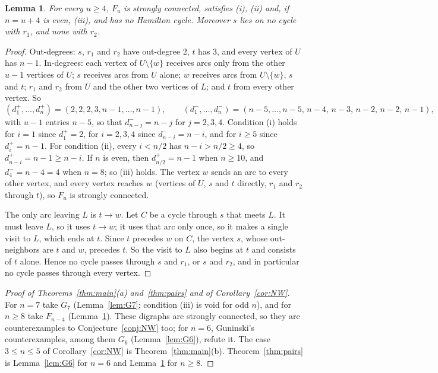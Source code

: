 \documentclass[11pt]{article}
\newtheorem{lemma}[theorem]{Lemma}
\begin{document}
\begin{lemma}\label{lem:F}
For every $u\ge4$, $F_u$ is strongly connected, satisfies (i), (ii) and, if $n=u+4$ is even, (iii), and has no Hamilton cycle. Moreover $s$ lies on no cycle with $r_1$, and none with $r_2$.
\end{lemma}

\begin{proof}
Out-degrees: $s$, $r_1$ and $r_2$ have out-degree $2$, $t$ has $3$, and every vertex of $U$ has $n-1$. In-degrees: each vertex of $U\setminus\{w\}$ receives arcs only from the other $u-1$ vertices of $U$; $s$ receives arcs from $U$ alone; $w$ receives arcs from $U\setminus\{w\}$, $s$ and $t$; $r_1$ and $r_2$ from $U$ and the other two vertices of $L$; and $t$ from every other vertex. So
\[
(d^+_1,\dots,d^+_n)=(2,2,2,3,n-1,\dots,n-1),\qquad
(d^-_1,\dots,d^-_n)=(n-5,\dots,n-5,\,n-4,\,n-3,\,n-2,\,n-2,\,n-1),
\]
with $u-1$ entries $n-5$, so that $d^-_{n-j}=n-j$ for $j=2,3,4$. Condition (i) holds for $i=1$ since $d^+_1=2$, for $i=2,3,4$ since $d^-_{n-i}=n-i$, and for $i\ge5$ since $d^+_i=n-1$. For condition (ii), every $i<n/2$ has $n-i>n/2\ge4$, so $d^+_{n-i}=n-1\ge n-i$. If $n$ is even, then $d^+_{n/2}=n-1$ when $n\ge10$, and $d^-_4=n-4=4$ when $n=8$; so (iii) holds. The vertex $w$ sends an arc to every other vertex, and every vertex reaches $w$ (vertices of $U$, $s$ and $t$ directly, $r_1$ and $r_2$ through $t$), so $F_u$ is strongly connected.

The only arc leaving $L$ is $t\to w$. Let $C$ be a cycle through $s$ that meets $L$. It must leave $L$, so it uses $t\to w$; it uses that arc only once, so it makes a single visit to $L$, which ends at $t$. Since $t$ precedes $w$ on $C$, the vertex $s$, whose out-neighbors are $t$ and $w$, precedes $t$. So the visit to $L$ also begins at $t$ and consists of $t$ alone. Hence no cycle passes through $s$ and $r_1$, or $s$ and $r_2$, and in particular no cycle passes through every vertex.
\end{proof}

\begin{proof}[Proof of Theorems~\ref{thm:main}(a) and~\ref{thm:pairs} and of Corollary~\ref{cor:NW}]
For $n=7$ take $G_7$ (Lemma~\ref{lem:G7}; condition (iii) is void for odd $n$), and for $n\ge8$ take $F_{n-4}$ (Lemma~\ref{lem:F}). These digraphs are strongly connected, so they are counterexamples to Conjecture~\ref{conj:NW} too; for $n=6$, Guninski's counterexamples, among them $G_6$ (Lemma~\ref{lem:G6}), refute it. The case $3\le n\le5$ of Corollary~\ref{cor:NW} is Theorem~\ref{thm:main}(b). Theorem~\ref{thm:pairs} is Lemma~\ref{lem:G6} for $n=6$ and Lemma~\ref{lem:F} for $n\ge8$.
\end{proof}
\end{document}
